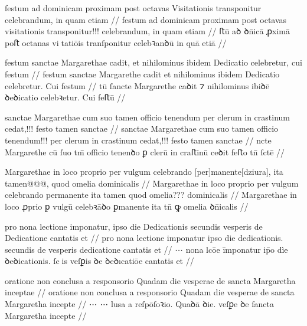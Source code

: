 \ex \bg
\gla
{}
festum ad dominicam proximam post octavas Visitationis transponitur celebrandum, in quam etiam
//
\glRekonstrukcja
{}
festum ad dominicam proximam post octavas visitationis transponitur!!! celebrandum, in quam etiam
//
\glU
{}
ﬅū aꝺ ꝺn̄icā ꝓximā poﬅ octanas vitatiōis tranſponitur celebꝛanꝺū in quā etiā
//
\endgl
\xe



\ex \bg
\gla
{}
festum sanctae Margarethae cadit,
et nihilominus ibidem Dedicatio celebretur, cui festum
//
\glRekonstrukcja
{}
festum sanctae Margarethe cadit
et nihilominus ibidem Dedicatio celebretur. Cui festum
//
\glU
{}
tū ſancte Margarethe caꝺit ⁊ nihilominus ibiꝺē ꝺeꝺicatio celebꝛetur. Cui feﬅū
//
\endgl
\xe



\ex \bg
\gla
{}
sanctae Margarethae cum suo tamen officio tenendum per clerum in crastinum cedat,!!!
festo tamen sanctae
//
\glRekonstrukcja
{}
sanctae Margarethae cum suo tamen officio tenendum!!! per clerum in crastinum cedat,!!!
festo tamen sanctae
//
\glU
{}
ncte Margarethe cū ſuo tm̄ oﬀicio tenenꝺo ꝑ clerū in craﬅinū ceꝺit feﬅo tn̄ ſctē
//
\endgl
\xe



\ex \bg
\gla
{}
Margarethae in loco proprio per vulgum celebrando
[per]manente[dziura], ita tamen@@@, quod omelia dominicalis
//
\glRekonstrukcja
{}
Margarethae in loco proprio per vulgum celebrando
permanente ita tamen quod omelia??? dominicalis
//
\glU
{}
Margarethae in loco ꝓprio ꝑ vulgū celebꝛāꝺo ꝑmanente ita tn̄ ꝙ omelia ꝺn̄icalis
//
\endgl
\xe



\ex \bg
\gla
{}
pro nona lectione
imponatur, ipso die Dedicationis secundis {} vesperis de Dedicatione cantatis et
//
\glRekonstrukcja
{}
pro nona lectione
imponatur ipso die dedicationis. secundis de vesperis {} dedicatione cantatis et
//
\glU
{}
⋯ nona lcōe īmponatur ip̄o dìe ꝺeꝺicationis. ſcis {} veſꝑis  ꝺe ꝺeꝺıcatiōe cantatis et
//
\endgl
\xe



\ex \bg
\gla
{}
oratione non conclusa a responsorio Quadam die vesperae de
sancta Margaretha inceptae
//
\glRekonstrukcja
{}
oratione non conclusa a responsorio Quadam die vesperae de
sancta Margaretha incepte
//
\glU
{}
⋯ ⋯ lusa a reſpōſoꝛio. Quaꝺā ꝺie. veſꝑe ꝺe ſancta Margaretha incepte
//
\endgl
\xe



